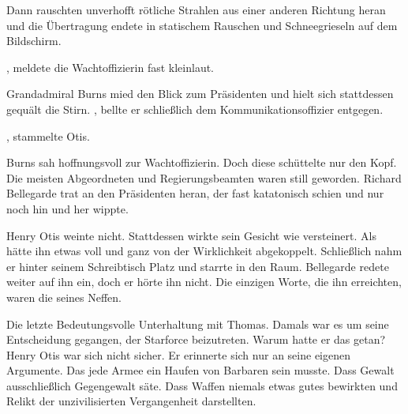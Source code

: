 \par

Dann rauschten unverhofft rötliche Strahlen aus einer anderen Richtung heran und die Übertragung endete in statischem Rauschen und Schneegrieseln auf dem Bildschirm.

\par

, meldete die Wachtoffizierin fast kleinlaut.

\par

Grandadmiral Burns mied den Blick zum Präsidenten und hielt sich stattdessen gequält die Stirn. , bellte er schließlich dem Kommunikationsoffizier entgegen.

\par

, stammelte Otis. 

\par

Burns sah hoffnungsvoll zur Wachtoffizierin. Doch diese schüttelte nur den Kopf. Die meisten Abgeordneten und Regierungsbeamten waren still geworden. Richard Bellegarde trat an den Präsidenten heran, der fast katatonisch schien und nur noch hin und her wippte.

\par

Henry Otis weinte nicht. Stattdessen wirkte sein Gesicht wie versteinert. Als hätte ihn etwas voll und ganz von der Wirklichkeit abgekoppelt. Schließlich nahm er hinter seinem Schreibtisch Platz und starrte in den Raum. Bellegarde redete weiter auf ihn ein, doch er hörte ihn nicht. Die einzigen Worte, die ihn erreichten, waren die seines Neffen.

\par

Die letzte Bedeutungsvolle Unterhaltung mit Thomas. Damals war es um seine Entscheidung gegangen, der Starforce beizutreten. Warum hatte er das getan? Henry Otis war sich nicht sicher. Er erinnerte sich nur an seine eigenen Argumente. Das jede Armee ein Haufen von Barbaren sein musste. Dass Gewalt ausschließlich Gegengewalt säte. Dass Waffen niemals etwas gutes bewirkten und Relikt der unzivilisierten Vergangenheit darstellten.

\par

